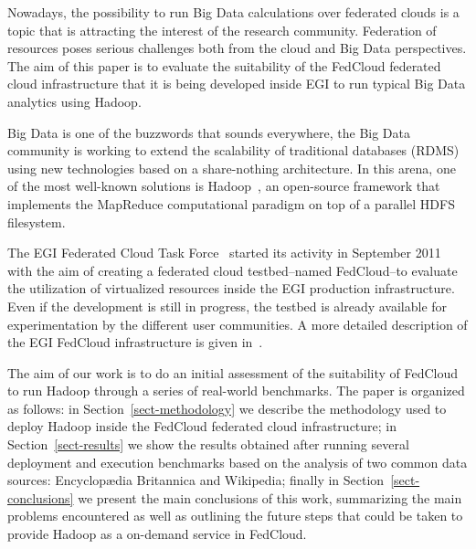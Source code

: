 \documentclass[oribibl]{llncs_Ibergrid2013}
\begin{document}

Nowadays, the possibility to run Big Data calculations over federated clouds is a topic that is attracting the interest of the research community. Federation of resources poses serious challenges both from the cloud and Big Data perspectives. The aim of this paper is to evaluate the suitability of the FedCloud federated cloud infrastructure that it is being developed inside EGI to run typical Big Data analytics using Hadoop. 

Big Data is one of the buzzwords that sounds everywhere, the Big Data community is working to extend the scalability of traditional databases (RDMS) using new technologies based on a share-nothing architecture. In this arena, one of the most well-known solutions is Hadoop~\cite{hadoop}, an open-source framework that implements the MapReduce computational paradigm on top of a parallel HDFS filesystem.



The EGI Federated Cloud Task Force~\cite{fedcloud} started its activity in September 2011 with the aim of creating a federated cloud testbed--named FedCloud--to evaluate the utilization of virtualized resources inside the EGI production infrastructure. Even if the development is still in progress, the testbed is already available for experimentation by the different user communities. A more detailed description of the EGI FedCloud infrastructure is given in~\cite{egifedcloud}.


The aim of our work is to do an initial assessment of the suitability of FedCloud to run Hadoop through a series of real-world benchmarks. The paper is organized as follows: in Section~\ref{sect-methodology} we describe the methodology used to deploy Hadoop inside the FedCloud federated cloud infrastructure; in Section~\ref{sect-results} we show the results obtained after running several deployment and execution benchmarks based on the analysis of two common data sources: Encyclop{\ae}dia Britannica and Wikipedia; finally in Section~\ref{sect-conclusions} we present the main conclusions of this work, summarizing the main problems encountered as well as outlining the future steps that could be taken to provide Hadoop as a on-demand service in FedCloud.
\end{document}
